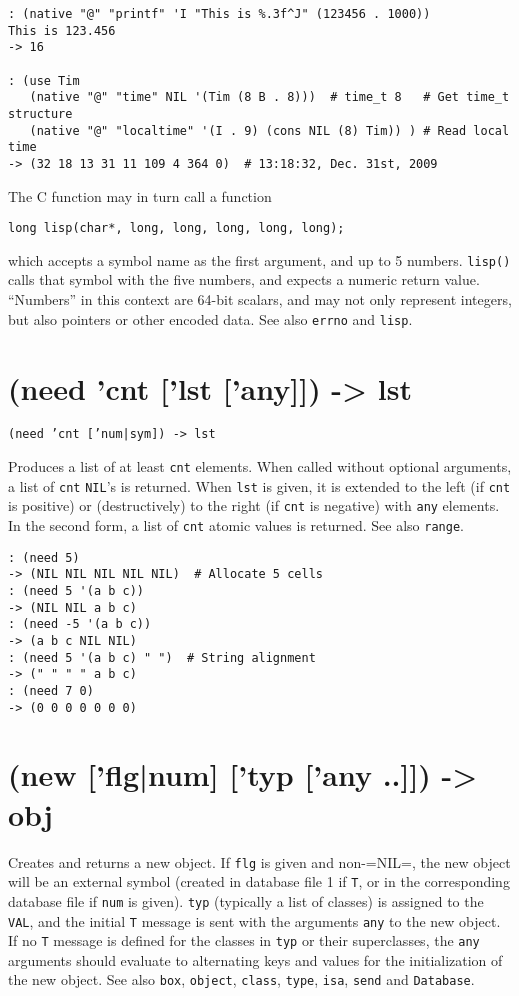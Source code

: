 {{{{{{{\begin{verbatim}
: (native "@" "printf" 'I "This is %.3f^J" (123456 . 1000))
This is 123.456
-> 16

: (use Tim
   (native "@" "time" NIL '(Tim (8 B . 8)))  # time_t 8   # Get time_t structure
   (native "@" "localtime" '(I . 9) (cons NIL (8) Tim)) ) # Read local time
-> (32 18 13 31 11 109 4 364 0)  # 13:18:32, Dec. 31st, 2009
\end{verbatim}

The C function may in turn call a function


\begin{verbatim}
long lisp(char*, long, long, long, long, long);
\end{verbatim}

which accepts a symbol name as the first argument, and up to 5 numbers.
\texttt{lisp()} calls that symbol with the five numbers, and expects a numeric
return value. ``Numbers'' in this context are 64-bit scalars, and may not
only represent integers, but also pointers or other encoded data. See
also \texttt{errno} and \texttt{lisp}.

 
\section{(need 'cnt ['lst ['any]]) -> lst}
\label{sec-8-1-14-9}


\texttt{(need 'cnt ['num|sym]) -> lst}

Produces a list of at least \texttt{cnt} elements. When called without optional
arguments, a list of \texttt{cnt} \texttt{NIL}'s is returned. When \texttt{lst} is given, it
is extended to the left (if \texttt{cnt} is positive) or (destructively) to the
right (if \texttt{cnt} is negative) with \texttt{any} elements. In the second form, a
list of \texttt{cnt} atomic values is returned. See also \texttt{range}.


\begin{verbatim}
: (need 5)
-> (NIL NIL NIL NIL NIL)  # Allocate 5 cells
: (need 5 '(a b c))
-> (NIL NIL a b c)
: (need -5 '(a b c))
-> (a b c NIL NIL)
: (need 5 '(a b c) " ")  # String alignment
-> (" " " " a b c)
: (need 7 0)
-> (0 0 0 0 0 0 0)
\end{verbatim}

 
\section{(new ['flg|num] ['typ ['any ..]]) -> obj}
\label{sec-8-1-14-10}


Creates and returns a new object. If \texttt{flg} is given and non-=NIL=, the
new object will be an external symbol (created in database file 1 if
\texttt{T}, or in the corresponding database file if \texttt{num} is given). \texttt{typ}
(typically a list of classes) is assigned to the \texttt{VAL}, and the initial
\texttt{T} message is sent with the arguments \texttt{any} to the new object. If no
\texttt{T} message is defined for the classes in \texttt{typ} or their superclasses,
the \texttt{any} arguments should evaluate to alternating keys and values for
the initialization of the new object. See also \texttt{box}, \texttt{object}, \texttt{class},
\texttt{type}, \texttt{isa}, \texttt{send} and \texttt{Database}.


}}}}}}}
